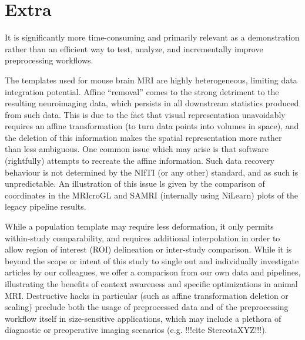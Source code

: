 \section{Extra}


It is significantly more time-consuming and primarily relevant as a demonstration rather than an efficient way to test, analyze, and incrementally improve preprocessing workflows.

The templates used for mouse brain MRI are highly heterogeneous, limiting data integration potential.
Affine “removal” comes to the strong detriment to the resulting neuroimaging data, which persists in all downstream statistics produced from such data.
This is due to the fact that visual representation unavoidably requires an affine transformation (to turn data points into volumes in space), and the deletion of this information makes the spatial representation more rather than less ambiguous.
One common issue which may arise is that software (rightfully) attempts to recreate the affine information.
Such data recovery behaviour is not determined by the NIfTI (or any other) standard, and as such is unpredictable.
An illustration of this issue ls given by the comparison of coordinates in the MRIcroGL and SAMRI (internally using NiLearn) plots of the legacy pipeline results.

While a population template may require less deformation, it only permits within-study comparability, and requires additional interpolation in order to allow region of interest (ROI) delineation or inter-study comparison.
While it is beyond the scope or intent of this study to single out and individually investigate articles by our colleagues, we offer a comparison from our own data and pipelines, illustrating the benefits of context awareness and specific optimizations in animal MRI.
Destructive hacks in particular (such as affine transformation deletion or scaling) preclude both the usage of preprocessed data and of the preprocessing workflow itself in size-sensitive applications, which may include a plethora of diagnostic or preoperative imaging scenarios (e.g. !!!cite StereotaXYZ!!!).

